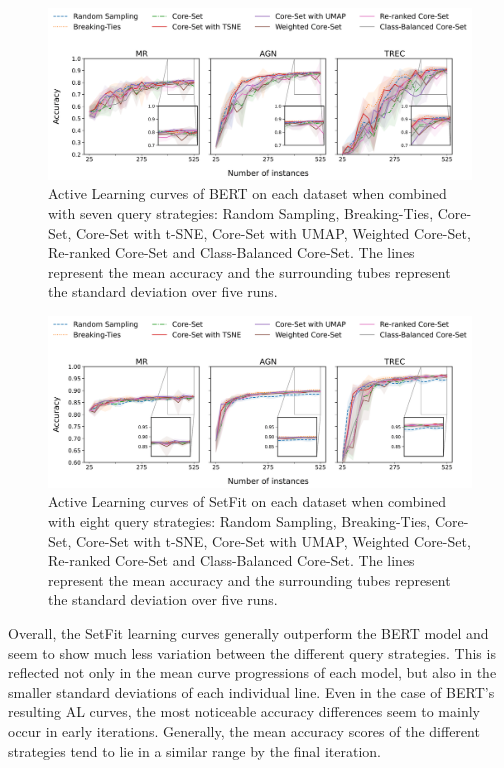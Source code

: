 \documentclass[english,bachelor,ul]{webisthesis} %
\begin{document}
\begin{figure}[htbp]
    \centering
    \includegraphics[width=1\textwidth]{img/bert-plots-1.png}
    \caption{Active Learning curves of BERT on each dataset when combined with seven query strategies: Random Sampling, Breaking-Ties, Core-Set, Core-Set with t-SNE, Core-Set with UMAP, Weighted Core-Set, Re-ranked Core-Set and Class-Balanced Core-Set. The lines represent the mean accuracy and the surrounding tubes represent the standard deviation over five runs.}
    \label{fig:bert-curves}
\end{figure}

\begin{figure}[htbp]
    \centering
    \includegraphics[width=1\textwidth]{img/setfit-plots-1.png}
    \caption{Active Learning curves of SetFit on each dataset when combined with eight query strategies: Random Sampling, Breaking-Ties, Core-Set, Core-Set with t-SNE, Core-Set with UMAP, Weighted Core-Set, Re-ranked Core-Set and Class-Balanced Core-Set. The lines represent the mean accuracy and the surrounding tubes represent the standard deviation over five runs.}
    \label{fig:setfit-curves}
\end{figure}

\clearpage

Overall, the SetFit learning curves generally outperform the BERT model and seem to show much less variation between the different query strategies. This is reflected not only in the mean curve progressions of each model, but also in the smaller standard deviations of each individual line. Even in the case of BERT's resulting AL curves, the most noticeable accuracy differences seem to mainly occur in early iterations. Generally, the mean accuracy scores of the different strategies tend to lie in a similar range by the final iteration. 
\end{document}

